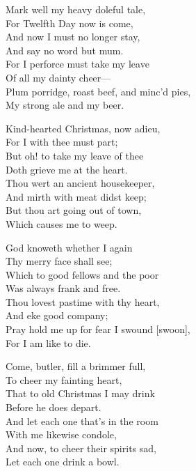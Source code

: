 \begin{dcverse}\begin{altverse}
Mark well my heavy doleful tale,\\
For Twelfth Day now is come,\\
And now I must no longer stay,\\
And say no word but mum.\\
For I perforce must take my leave\\
Of all my dainty cheer—\\
Plum porridge, roast beef, and minc’d pies,\\
My strong ale and my beer.
\end{altverse}

\begin{altverse}
Kind-hearted Christmas, now adieu,\\
For I with thee must part;\\
But oh! to take my leave of thee\\
Doth grieve me at the heart.\\
Thou wert an ancient housekeeper,\\
And mirth with meat didst keep;\\
But thou art going out of town,\\
Which causes me to weep.
\end{altverse}

\begin{altverse}
God knoweth whether I again\\
Thy merry face shall see;\\
Which to good fellows and the poor\\
Was always frank and free.\\
Thou lovest pastime with thy heart,\\
And eke good company;\\
Pray hold me up for fear I swound [swoon],\\
For I am like to die.
\end{altverse}

\begin{altverse}
Come, butler, fill a brimmer full,\\
To cheer my fainting heart,\\
That to old Christmas I may drink\\
Before he does depart.\\
And let each one that’s in the room\\
With me likewise condole,\\
And now, to cheer their spirits sad,\\
Let each one drink a bowl.
\end{altverse}


\end{dcverse}
